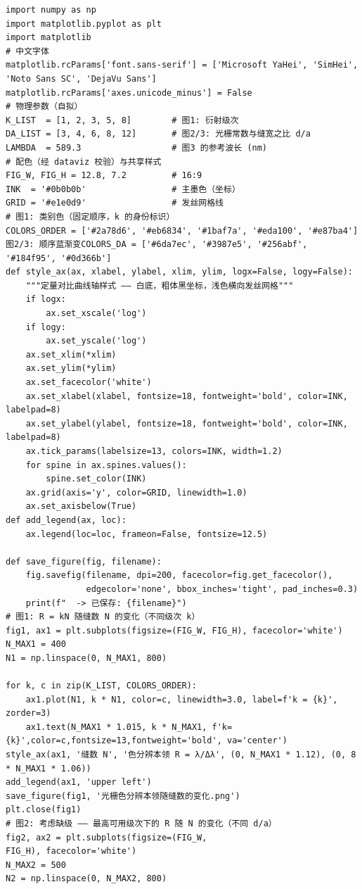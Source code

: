 \documentclass[12pt,a4paper]{ctexrep}
\begin{document}
\begin{lstlisting}[style=pycode]
import numpy as np
import matplotlib.pyplot as plt
import matplotlib
# 中文字体
matplotlib.rcParams['font.sans-serif'] = ['Microsoft YaHei', 'SimHei', 'Noto Sans SC', 'DejaVu Sans']
matplotlib.rcParams['axes.unicode_minus'] = False
# 物理参数（自拟）
K_LIST  = [1, 2, 3, 5, 8]        # 图1: 衍射级次
DA_LIST = [3, 4, 6, 8, 12]       # 图2/3: 光栅常数与缝宽之比 d/a
LAMBDA  = 589.3                  # 图3 的参考波长 (nm)
# 配色（经 dataviz 校验）与共享样式
FIG_W, FIG_H = 12.8, 7.2         # 16:9
INK  = '#0b0b0b'                 # 主墨色（坐标）
GRID = '#e1e0d9'                 # 发丝网格线
# 图1: 类别色（固定顺序，k 的身份标识）
COLORS_ORDER = ['#2a78d6', '#eb6834', '#1baf7a', '#eda100', '#e87ba4']
图2/3: 顺序蓝渐变COLORS_DA = ['#6da7ec', '#3987e5', '#256abf', '#184f95', '#0d366b']
def style_ax(ax, xlabel, ylabel, xlim, ylim, logx=False, logy=False):
    """定量对比曲线轴样式 —— 白底，粗体黑坐标，浅色横向发丝网格"""
    if logx:
        ax.set_xscale('log')
    if logy:
        ax.set_yscale('log')
    ax.set_xlim(*xlim)
    ax.set_ylim(*ylim)
    ax.set_facecolor('white')
    ax.set_xlabel(xlabel, fontsize=18, fontweight='bold', color=INK, labelpad=8)
    ax.set_ylabel(ylabel, fontsize=18, fontweight='bold', color=INK, labelpad=8)
    ax.tick_params(labelsize=13, colors=INK, width=1.2)
    for spine in ax.spines.values():
        spine.set_color(INK)
    ax.grid(axis='y', color=GRID, linewidth=1.0)
    ax.set_axisbelow(True)
def add_legend(ax, loc):
    ax.legend(loc=loc, frameon=False, fontsize=12.5)

def save_figure(fig, filename):
    fig.savefig(filename, dpi=200, facecolor=fig.get_facecolor(),
                edgecolor='none', bbox_inches='tight', pad_inches=0.3)
    print(f"  -> 已保存: {filename}")
# 图1: R = kN 随缝数 N 的变化（不同级次 k）
fig1, ax1 = plt.subplots(figsize=(FIG_W, FIG_H), facecolor='white')
N_MAX1 = 400
N1 = np.linspace(0, N_MAX1, 800)

for k, c in zip(K_LIST, COLORS_ORDER):
    ax1.plot(N1, k * N1, color=c, linewidth=3.0, label=f'k = {k}', zorder=3)
    ax1.text(N_MAX1 * 1.015, k * N_MAX1, f'k={k}',color=c,fontsize=13,fontweight='bold', va='center')
style_ax(ax1, '缝数 N', '色分辨本领 R = λ/Δλ', (0, N_MAX1 * 1.12), (0, 8 * N_MAX1 * 1.06))
add_legend(ax1, 'upper left')
save_figure(fig1, '光栅色分辨本领随缝数的变化.png')
plt.close(fig1)
# 图2: 考虑缺级 —— 最高可用级次下的 R 随 N 的变化（不同 d/a）
fig2, ax2 = plt.subplots(figsize=(FIG_W,
FIG_H), facecolor='white')
N_MAX2 = 500
N2 = np.linspace(0, N_MAX2, 800)


\end{lstlisting}
\end{document}

